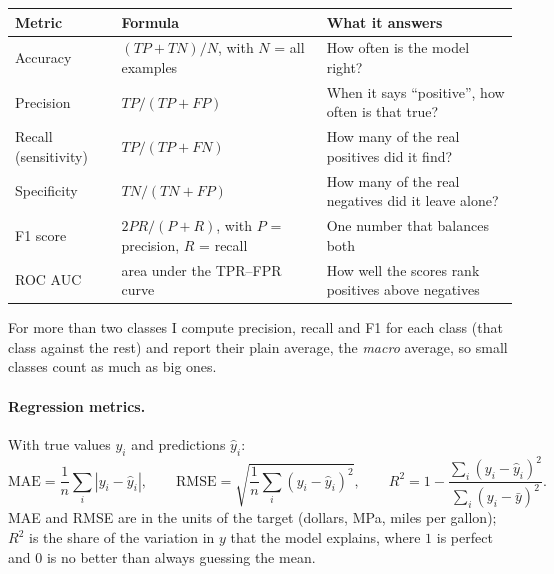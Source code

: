 \begin{table}[H]
\centering\small
\begin{tabularx}{\linewidth}{@{}l l >{\raggedright\arraybackslash}X@{}}
\toprule
\textbf{Metric} & \textbf{Formula} & \textbf{What it answers} \\
\midrule
Accuracy & $(TP+TN)/N$, with $N$ = all examples & How often is the model right? \\
Precision & $TP/(TP+FP)$ & When it says ``positive'', how often is that true? \\
Recall (sensitivity) & $TP/(TP+FN)$ & How many of the real positives did it find? \\
Specificity & $TN/(TN+FP)$ & How many of the real negatives did it leave alone? \\
F1 score & $2PR/(P+R)$, with $P$ = precision, $R$ = recall & One number that balances both \\
ROC AUC & area under the TPR--FPR curve & How well the scores rank positives above negatives \\
\bottomrule
\end{tabularx}
\end{table}

\noindent For more than two classes I compute precision, recall and F1 for each class (that class against
the rest) and report their plain average, the \emph{macro} average, so small classes count as much as big
ones.

\paragraph{Regression metrics.} With true values $y_i$ and predictions $\hat y_i$:
\[
\text{MAE}=\frac1n\sum_i|y_i-\hat y_i|,\qquad
\text{RMSE}=\sqrt{\frac1n\sum_i(y_i-\hat y_i)^2},\qquad
R^2=1-\frac{\sum_i(y_i-\hat y_i)^2}{\sum_i(y_i-\bar y)^2}.
\]
MAE and RMSE are in the units of the target (dollars, MPa, miles per gallon); $R^2$ is the share of the
variation in $y$ that the model explains, where $1$ is perfect and $0$ is no better than always guessing
the mean.

\clearpage
